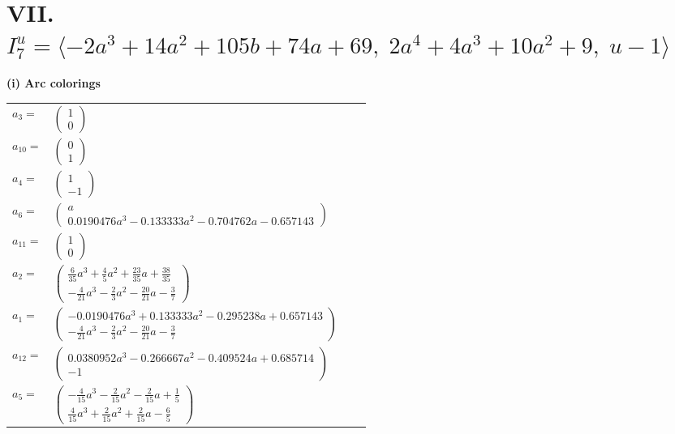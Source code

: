 \documentclass[1p]{elsarticle_modified}
\theoremstyle{definition}
\begin{document}
\centering \section*{VII. $I^u_{7}= \langle -2 a^3+14 a^2+105 b+74 a+69,\;2 a^4+4 a^3+10 a^2+9,\;u-1 \rangle$}
\flushleft \textbf{(i) Arc colorings}\\
\begin{tabular}{m{7pt} m{180pt} m{7pt} m{180pt} }
\flushright $a_{3}=$&$\begin{pmatrix}1\\0\end{pmatrix}$ \\
\flushright $a_{10}=$&$\begin{pmatrix}0\\1\end{pmatrix}$ \\
\flushright $a_{4}=$&$\begin{pmatrix}1\\-1\end{pmatrix}$ \\
\flushright $a_{6}=$&$\begin{pmatrix}a\\0.0190476 a^{3}-0.133333 a^{2}-0.704762 a-0.657143\end{pmatrix}$ \\
\flushright $a_{11}=$&$\begin{pmatrix}1\\0\end{pmatrix}$ \\
\flushright $a_{2}=$&$\begin{pmatrix}\frac{6}{35} a^3+\frac{4}{5} a^2+\frac{23}{35} a+\frac{38}{35}\\-\frac{4}{21} a^3-\frac{2}{3} a^2-\frac{20}{21} a-\frac{3}{7}\end{pmatrix}$ \\
\flushright $a_{1}=$&$\begin{pmatrix}-0.0190476 a^{3}+0.133333 a^{2}-0.295238 a+0.657143\\-\frac{4}{21} a^3-\frac{2}{3} a^2-\frac{20}{21} a-\frac{3}{7}\end{pmatrix}$ \\
\flushright $a_{12}=$&$\begin{pmatrix}0.0380952 a^{3}-0.266667 a^{2}-0.409524 a+0.685714\\-1\end{pmatrix}$ \\
\flushright $a_{5}=$&$\begin{pmatrix}-\frac{4}{15} a^3-\frac{2}{15} a^2-\frac{2}{15} a+\frac{1}{5}\\\frac{4}{15} a^3+\frac{2}{15} a^2+\frac{2}{15} a-\frac{6}{5}\end{pmatrix}$ \\

\end{tabular}
\end{document}
